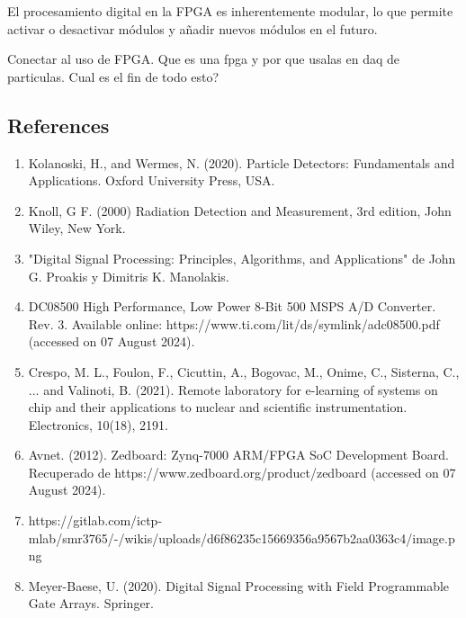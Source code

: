 \documentclass[]{book}
\begin{document}
\noindent El procesamiento digital en la FPGA es inherentemente modular, lo que permite activar o desactivar módulos y añadir nuevos módulos en el futuro.

\noindent Conectar al uso de FPGA. Que es una fpga y por que usalas en daq de particulas. Cual es el fin de todo esto?    

\subsection*{References}
\begin{enumerate}

    \item Kolanoski, H., and Wermes, N. (2020). Particle Detectors: Fundamentals and Applications. Oxford University Press, USA.
    \item Knoll, G F. (2000) Radiation Detection and Measurement, 3rd edition, John Wiley, New
    York.
    \item "Digital Signal Processing: Principles, Algorithms, and Applications" de John G. Proakis y Dimitris K. Manolakis.
    \item DC08500 High Performance, Low Power 8-Bit 500 MSPS A/D Converter. Rev. 3. Available online: https://www.ti.com/lit/ds/symlink/adc08500.pdf (accessed on 07 August 2024).
    \item Crespo, M. L., Foulon, F., Cicuttin, A., Bogovac, M., Onime, C., Sisterna, C., ... and Valinoti, B. (2021). Remote laboratory for e-learning of systems on chip and their applications to nuclear and scientific instrumentation. Electronics, 10(18), 2191.
    \item Avnet. (2012). Zedboard: Zynq-7000 ARM/FPGA SoC Development Board. Recuperado de https://www.zedboard.org/product/zedboard (accessed on 07 August 2024).
    \item https://gitlab.com/ictp-mlab/smr3765/-/wikis/uploads/d6f86235c15669356a9567b2aa0363c4/image.png
    \item Meyer-Baese, U. (2020). Digital Signal Processing with Field Programmable Gate Arrays. Springer.
\end{enumerate}
\end{document}
